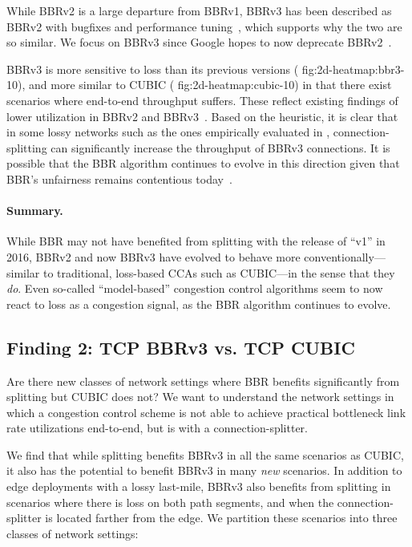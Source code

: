 While BBRv2 is a large departure from BBRv1, BBRv3 has been described as BBRv2
with bugfixes and performance tuning~\cite{cardwell2024bbrv3-ietf119}, which
supports why the two are so similar. We focus on BBRv3 since Google hopes to
now deprecate BBRv2~\cite{cardwell2024bbrv3-ietf119}.

BBRv3 is more sensitive to loss than its previous versions (\Cref
{fig:2d-heatmap:bbr3-10}), and more similar to CUBIC (\Cref
{fig:2d-heatmap:cubic-10}) in that there exist scenarios where end-to-end
throughput suffers.
These reflect existing findings of lower utilization in BBRv2 and BBRv3~\cite
{datta2023replication,song2021understanding,zeynali2024promises}.
Based on the heuristic, it is clear that in some lossy networks
such as the ones empirically evaluated in ,
connection-splitting
can significantly increase the throughput of BBRv3 connections.
It is possible that the BBR algorithm continues to evolve in this direction
given that BBR's unfairness remains contentious today~\cite
{datta2023replication,zeynali2024promises}.

\paragraph{Summary.}

While BBR may not have benefited from splitting with the release of ``v1'' in 2016, BBRv2 and
now BBRv3 have evolved to behave more conventionally---similar to traditional,
loss-based CCAs such as CUBIC---in the sense that they \textit{do}. Even
so-called ``model-based'' congestion control algorithms seem to now react to
loss as a congestion signal, as the BBR algorithm continues to evolve.

\subsection{Finding 2: TCP BBRv3 vs. TCP CUBIC}
\label{sec:splitting:results:finding2}


Are there new classes of network settings where BBR benefits significantly from
splitting but CUBIC does not? We want to understand the network settings in
which a congestion control scheme is not able to achieve practical bottleneck
link rate utilizations end-to-end, but is with a connection-splitter.

We find that while splitting benefits BBRv3 in all the same scenarios as CUBIC,
it also has the potential to benefit BBRv3 in many \textit{new} scenarios.
In addition to edge deployments with a lossy last-mile, BBRv3
also benefits from splitting in scenarios where there is loss on both path
segments, and when the connection-splitter is located farther from the edge.
We partition these scenarios into three classes of network settings:


